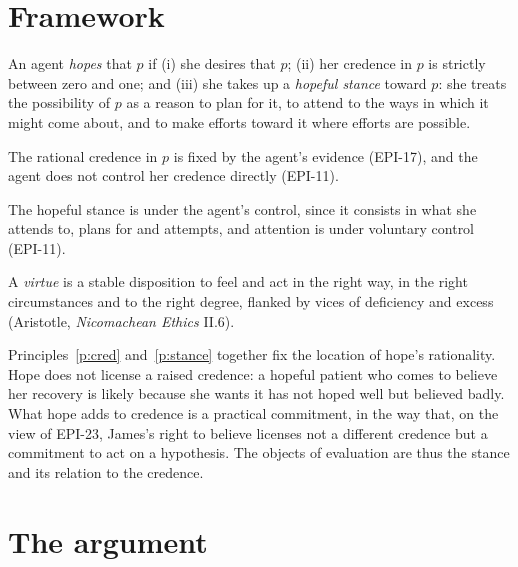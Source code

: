 \documentclass{situationist-preprint}
\begin{document}
\section{Framework}

\begin{definition}[Hope]\label{d:hope}
An agent \emph{hopes} that $p$ if (i) she desires that $p$; (ii) her credence in $p$ is strictly between zero and one; and (iii) she takes up a \emph{hopeful stance} toward $p$: she treats the possibility of $p$ as a reason to plan for it, to attend to the ways in which it might come about, and to make efforts toward it where efforts are possible.
\end{definition}

\begin{principle}\label{p:cred}
The rational credence in $p$ is fixed by the agent's evidence (EPI-17), and the agent does not control her credence directly (EPI-11).
\end{principle}

\begin{principle}\label{p:stance}
The hopeful stance is under the agent's control, since it consists in what she attends to, plans for and attempts, and attention is under voluntary control (EPI-11).
\end{principle}

\begin{definition}[Virtue]\label{d:virtue}
A \emph{virtue} is a stable disposition to feel and act in the right way, in the right circumstances and to the right degree, flanked by vices of deficiency and excess (Aristotle, \emph{Nicomachean Ethics} II.6).
\end{definition}

Principles~\ref{p:cred} and~\ref{p:stance} together fix the location of hope's rationality. Hope does not license a raised credence: a hopeful patient who comes to believe her recovery is likely because she wants it has not hoped well but believed badly. What hope adds to credence is a practical commitment, in the way that, on the view of EPI-23, James's right to believe licenses not a different credence but a commitment to act on a hypothesis. The objects of evaluation are thus the stance and its relation to the credence.

\section{The argument}
\end{document}
